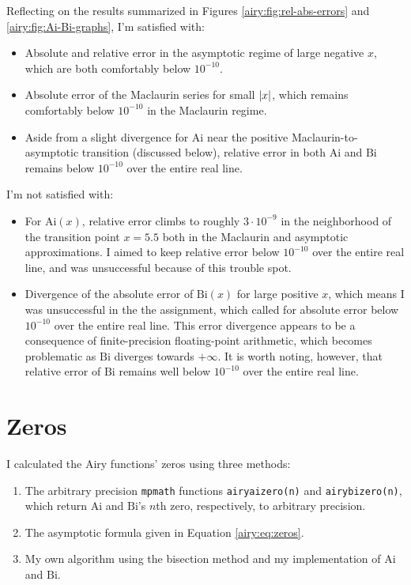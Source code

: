 \documentclass[11pt, a4paper]{article}
\newcommand{\Ai}{\mathrm{Ai}}
\newcommand{\Bi}{\mathrm{Bi}}
\begin{document}
Reflecting on the results summarized in Figures \ref{airy:fig:rel-abs-errors} and \ref{airy:fig:Ai-Bi-graphs}, I'm satisfied with:
\begin{itemize}
	\item Absolute and relative error in the asymptotic regime of large negative $ x $, which are both comfortably below $ 10^{-10} $.
	
	\item Absolute error of the Maclaurin series for small $ \abs{x} $, which remains comfortably below $ 10^{-10} $ in the Maclaurin regime.
	
	\item Aside from a slight divergence for $ \Ai $ near the positive Maclaurin-to-asymptotic transition (discussed below), relative error in both $ \Ai $ and $ \Bi $ remains below $ 10^{-10} $ over the entire real line.
	
\end{itemize}


I'm not satisfied with: 
\begin{itemize}
	\item For $ \Ai(x) $, relative error climbs to roughly $ 3\cdot 10^{-9} $ in the neighborhood of the transition point $ x = 5.5 $ both in the Maclaurin and asymptotic approximations. I aimed to keep relative error below $ 10^{-10} $ over the entire real line, and was unsuccessful because of this trouble spot.
	
	\item Divergence of the absolute error of $ \Bi(x) $ for large positive $ x $, which means I was unsuccessful in the the assignment, which called for absolute error below $ 10^{-10} $ over the entire real line. This error divergence appears to be a consequence of finite-precision floating-point arithmetic, which becomes problematic as $ \Bi $ diverges towards $ + \infty $. It is worth noting, however, that relative error of $ \Bi $ remains well below $ 10^{-10} $ over the entire real line.
	

	
\end{itemize}


\section{Zeros}
I calculated the Airy functions' zeros using three methods:
\begin{enumerate}
	\item The arbitrary precision \texttt{mpmath} functions \texttt{airyaizero(n)} and \texttt{airybizero(n)}, which return $ \Ai $ and $ \Bi $'s $ n $th zero, respectively, to arbitrary precision. 
	
	\item The asymptotic formula given in Equation \ref{airy:eq:zeros}.
	
	\item My own algorithm using the bisection method and my implementation of $ \Ai $ and $ \Bi $.
\end{enumerate}
\end{document}
